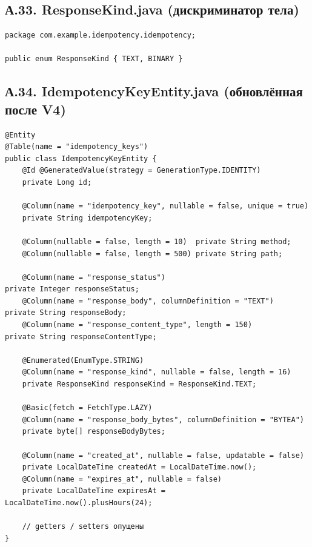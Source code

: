 \subsection*{А.33. ResponseKind.java (дискриминатор тела)}
\begin{lstlisting}[caption={Enum для различения текстового и бинарного снэпшота}]
package com.example.idempotency.idempotency;

public enum ResponseKind { TEXT, BINARY }
\end{lstlisting}

\subsection*{А.34. IdempotencyKeyEntity.java (обновлённая после V4)}
\begin{lstlisting}[caption={JPA-сущность со снэпшотом ответа (extract)}]
@Entity
@Table(name = "idempotency_keys")
public class IdempotencyKeyEntity {
    @Id @GeneratedValue(strategy = GenerationType.IDENTITY)
    private Long id;

    @Column(name = "idempotency_key", nullable = false, unique = true)
    private String idempotencyKey;

    @Column(nullable = false, length = 10)  private String method;
    @Column(nullable = false, length = 500) private String path;

    @Column(name = "response_status")                                   private Integer responseStatus;
    @Column(name = "response_body", columnDefinition = "TEXT")          private String responseBody;
    @Column(name = "response_content_type", length = 150)               private String responseContentType;

    @Enumerated(EnumType.STRING)
    @Column(name = "response_kind", nullable = false, length = 16)
    private ResponseKind responseKind = ResponseKind.TEXT;

    @Basic(fetch = FetchType.LAZY)
    @Column(name = "response_body_bytes", columnDefinition = "BYTEA")
    private byte[] responseBodyBytes;

    @Column(name = "created_at", nullable = false, updatable = false)
    private LocalDateTime createdAt = LocalDateTime.now();
    @Column(name = "expires_at", nullable = false)
    private LocalDateTime expiresAt = LocalDateTime.now().plusHours(24);

    // getters / setters опущены
}
\end{lstlisting}

